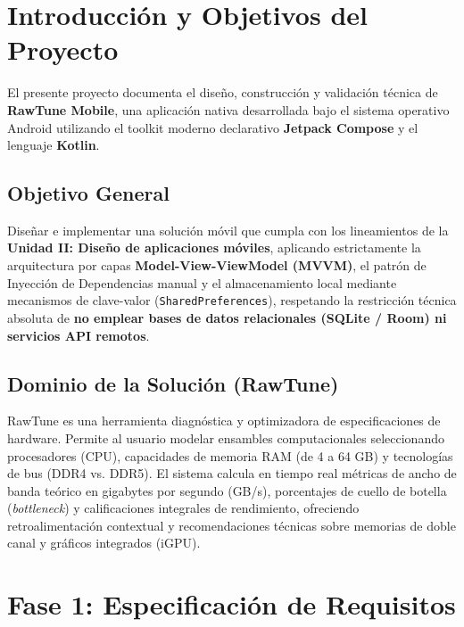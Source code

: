 \documentclass[12pt,a4paper]{article}
\begin{document}
\tableofcontents
\newpage

\section{Introducción y Objetivos del Proyecto}

El presente proyecto documenta el diseño, construcción y validación técnica de \textbf{RawTune Mobile}, una aplicación nativa desarrollada bajo el sistema operativo Android utilizando el toolkit moderno declarativo \textbf{Jetpack Compose} y el lenguaje \textbf{Kotlin}.

\subsection{Objetivo General}
Diseñar e implementar una solución móvil que cumpla con los lineamientos de la \textbf{Unidad II: Diseño de aplicaciones móviles}, aplicando estrictamente la arquitectura por capas \textbf{Model-View-ViewModel (MVVM)}, el patrón de Inyección de Dependencias manual y el almacenamiento local mediante mecanismos de clave-valor (\texttt{SharedPreferences}), respetando la restricción técnica absoluta de \textbf{no emplear bases de datos relacionales (SQLite / Room) ni servicios API remotos}.

\subsection{Dominio de la Solución (RawTune)}
RawTune es una herramienta diagnóstica y optimizadora de especificaciones de hardware. Permite al usuario modelar ensambles computacionales seleccionando procesadores (CPU), capacidades de memoria RAM (de 4 a 64 GB) y tecnologías de bus (DDR4 vs. DDR5). El sistema calcula en tiempo real métricas de ancho de banda teórico en gigabytes por segundo (GB/s), porcentajes de cuello de botella (\textit{bottleneck}) y calificaciones integrales de rendimiento, ofreciendo retroalimentación contextual y recomendaciones técnicas sobre memorias de doble canal y gráficos integrados (iGPU).

\section{Fase 1: Especificación de Requisitos}
\end{document}
